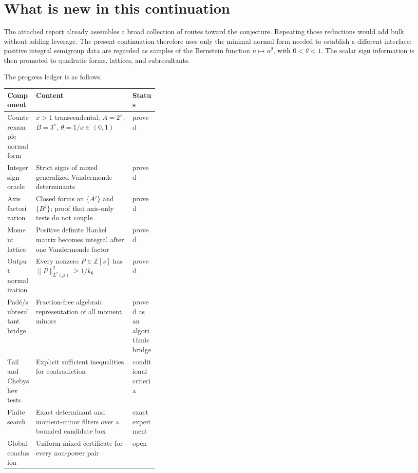\documentclass[11pt]{article}
\theoremstyle{definition}
\theoremstyle{remark}
\newcommand{\Z}{\mathbb Z}
\begin{document}
\tableofcontents

\section{What is new in this continuation}

The attached report already assembles a broad collection of routes toward the conjecture.
Repeating those reductions would add bulk without adding leverage.  The present continuation
therefore uses only the minimal normal form needed to establish a different interface:
positive integral semigroup data are regarded as samples of the Bernstein function
$u\mapsto u^\theta$, with $0<\theta<1$.  The scalar sign information is then promoted to
quadratic forms, lattices, and subresultants.

The progress ledger is as follows.

\begin{center}
\begin{tabularx}{0.94\linewidth}{@{}p{0.19\linewidth}X p{0.17\linewidth}@{}}
\toprule
Component & Content & Status\\
\midrule
Counterexample normal form & $x>1$ transcendental; $A=2^x$, $B=3^x$, $\theta=1/x\in(0,1)$ & proved\\
Integer sign oracle & Strict signs of mixed generalized Vandermonde determinants & proved\\
Axis factorization & Closed forms on $\{A^j\}$ and $\{B^j\}$; proof that axis-only tests do not couple & proved\\
Moment lattice & Positive definite Hankel matrix becomes integral after one Vandermonde factor & proved\\
Output normalization & Every nonzero $P\in\Z[s]$ has $\|P\|_{L^2(\mu)}^2\ge 1/k_0$ & proved\\
Pad\'e/subresultant bridge & Fraction-free algebraic representation of all moment minors & proved as an algorithmic bridge\\
Tail and Chebyshev tests & Explicit sufficient inequalities for contradiction & conditional criteria\\
Finite search & Exact determinant and moment-minor filters over a bounded candidate box & exact experiment\\
Global conclusion & Uniform mixed certificate for every non-power pair & open\\
\bottomrule
\end{tabularx}
\end{center}
\end{document}
